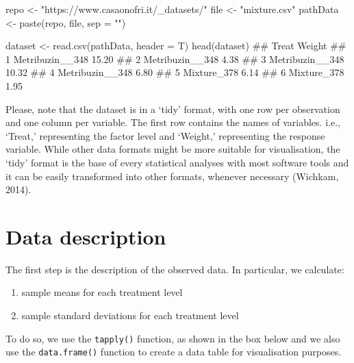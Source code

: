 \documentclass[a4paper,12pt,oneside]{book}
\providecommand{\tightlist}{%
  \setlength{\itemsep}{0pt}\setlength{\parskip}{0pt}}
\newenvironment{Shaded}{\begin{snugshade}}{\end{snugshade}}
\newcommand{\StringTok}[1]{#1}
\newcommand{\DocumentationTok}[1]{#1}
\newcommand{\OtherTok}[1]{#1}
\newcommand{\FunctionTok}[1]{#1}
\newcommand{\AttributeTok}[1]{#1}
\newcommand{\NormalTok}[1]{#1}
\begin{document}
\vspace{12pt}

\begin{Shaded}
\begin{Highlighting}[]
\NormalTok{repo }\OtherTok{\textless{}{-}} \StringTok{"https://www.casaonofri.it/\_datasets/"}
\NormalTok{file }\OtherTok{\textless{}{-}} \StringTok{"mixture.csv"}
\NormalTok{pathData }\OtherTok{\textless{}{-}} \FunctionTok{paste}\NormalTok{(repo, file, }\AttributeTok{sep =} \StringTok{""}\NormalTok{)}

\NormalTok{dataset }\OtherTok{\textless{}{-}} \FunctionTok{read.csv}\NormalTok{(pathData, }\AttributeTok{header =}\NormalTok{ T)}
\FunctionTok{head}\NormalTok{(dataset)}
\DocumentationTok{\#\#             Treat Weight}
\DocumentationTok{\#\# 1 Metribuzin\_\_348  15.20}
\DocumentationTok{\#\# 2 Metribuzin\_\_348   4.38}
\DocumentationTok{\#\# 3 Metribuzin\_\_348  10.32}
\DocumentationTok{\#\# 4 Metribuzin\_\_348   6.80}
\DocumentationTok{\#\# 5     Mixture\_378   6.14}
\DocumentationTok{\#\# 6     Mixture\_378   1.95}
\end{Highlighting}
\end{Shaded}

Please, note that the dataset is in a `tidy' format, with one row per observation and one column per variable. The first row contains the names of variables. i.e., `Treat,' representing the factor level and `Weight,' representing the response variable. While other data formats might be more suitable for visualisation, the `tidy' format is the base of every statistical analyses with most software tools and it can be easily transformed into other formats, whenever necessary (Wichkam, 2014).

\hypertarget{data-description}{%
\section{Data description}\label{data-description}}

The first step is the description of the observed data. In particular, we calculate:

\begin{enumerate}
\def\labelenumi{\arabic{enumi}.}
\tightlist
\item
  sample means for each treatment level
\item
  sample standard deviations for each treatment level
\end{enumerate}

To do so, we use the \texttt{tapply()} function, as shown in the box below and we also use the \texttt{data.frame()} function to create a data table for visualisation purposes.
\end{document}
